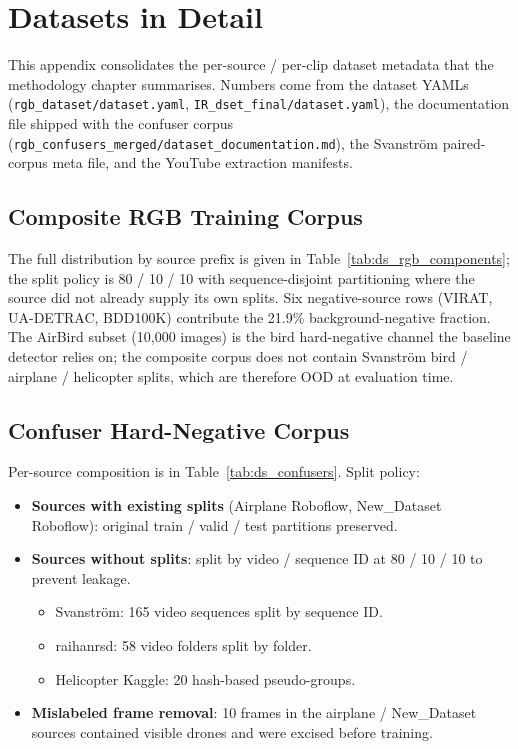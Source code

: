 \appendix

\chapter{Datasets in Detail}
\label{app:datasets}

This appendix consolidates the per-source / per-clip dataset metadata that the methodology chapter summarises. Numbers come from the dataset YAMLs (\texttt{rgb\_dataset/dataset.yaml}, \texttt{IR\_dset\_final/dataset.yaml}), the documentation file shipped with the confuser corpus (\texttt{rgb\_confusers\_merged/dataset\_documentation.md}), the Svanstr\"om paired-corpus meta file, and the YouTube extraction manifests.

\section{Composite RGB Training Corpus}

The full distribution by source prefix is given in Table~\ref{tab:ds_rgb_components}; the split policy is 80 / 10 / 10 with sequence-disjoint partitioning where the source did not already supply its own splits. Six negative-source rows (VIRAT, UA-DETRAC, BDD100K) contribute the 21.9\% background-negative fraction. The AirBird subset (10{,}000 images) is the bird hard-negative channel the baseline detector relies on; the composite corpus does not contain Svanstr\"om bird / airplane / helicopter splits, which are therefore OOD at evaluation time.

\section{Confuser Hard-Negative Corpus}

Per-source composition is in Table~\ref{tab:ds_confusers}. Split policy:

\begin{itemize}
    \item \textbf{Sources with existing splits} (Airplane Roboflow, New\_Dataset Roboflow): original train / valid / test partitions preserved.
    \item \textbf{Sources without splits}: split by video / sequence ID at 80 / 10 / 10 to prevent leakage.
    \begin{itemize}
        \item Svanstr\"om: 165 video sequences split by sequence ID.
        \item raihanrsd: 58 video folders split by folder.
        \item Helicopter Kaggle: 20 hash-based pseudo-groups.
    \end{itemize}
    \item \textbf{Mislabeled frame removal}: 10 frames in the airplane / New\_Dataset sources contained visible drones and were excised before training.
\end{itemize}


